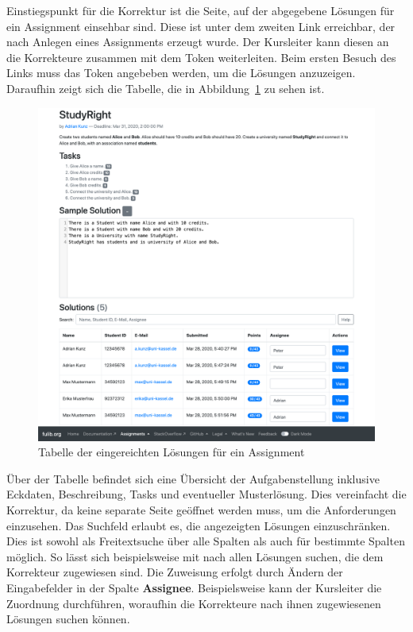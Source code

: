 Einstiegspunkt für die Korrektur ist die Seite, auf der abgegebene Lösungen für ein Assignment einsehbar sind.
Diese ist unter dem zweiten Link erreichbar, der nach Anlegen eines Assignments erzeugt wurde.
Der Kursleiter kann diesen an die Korrekteure zusammen mit dem Token weiterleiten.
Beim ersten Besuch des Links muss das Token angebeben werden, um die Lösungen anzuzeigen.
Daraufhin zeigt sich die Tabelle, die in Abbildung~\ref{fig:solution-table} zu sehen ist.

\begin{figure}
    \centering
    \includegraphics[width=\textwidth]{chapter/fulib.org/img/solution-table.png}
    \caption{Tabelle der eingereichten Lösungen für ein Assignment}
    \label{fig:solution-table}
\end{figure}

Über der Tabelle befindet sich eine Übersicht der Aufgabenstellung inklusive Eckdaten, Beschreibung, Tasks und eventueller Musterlösung.
Dies vereinfacht die Korrektur, da keine separate Seite geöffnet werden muss, um die Anforderungen einzusehen.
Das Suchfeld erlaubt es, die angezeigten Lösungen einzuschränken.
Dies ist sowohl als Freitextsuche über alle Spalten als auch für bestimmte Spalten möglich.
So lässt sich beispielsweise mit  nach allen Lösungen suchen, die dem Korrekteur  zugewiesen sind.
Die Zuweisung erfolgt durch Ändern der Eingabefelder in der Spalte \textbf{Assignee}.
Beispielsweise kann der Kursleiter die Zuordnung durchführen, woraufhin die Korrekteure nach ihnen zugewiesenen Lösungen suchen können.

